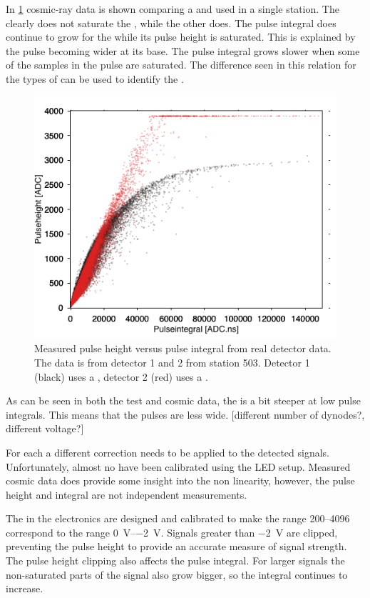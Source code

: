 In \cref{fig:ph_pi_503} cosmic-ray data is shown comparing a \nikhef and \senstech \pmt used in a single station. The \senstech \pmt clearly does not saturate the \adcs, while the other does. The pulse integral does continue to grow for the \nikhef \pmt while its pulse height is saturated. This is explained by the pulse becoming wider at its base. The pulse integral grows slower when some of the samples in the pulse are saturated. The difference seen in this relation for the types of \pmts can be used to identify the \pmt.

\begin{figure}
    \centering
    \includegraphics[width=.7\textwidth]{plots/station/ph_pi_503.png}
    \caption{Measured pulse height versus pulse integral from real detector data. The data is from detector 1 and 2 from station 503. Detector 1 (black) uses a \senstech \pmt, detector 2 (red) uses a \nikhef \pmt.}
    \label{fig:ph_pi_503}
\end{figure}

As can be seen in both the test and cosmic data, the \senstech \pmt is a bit steeper at low pulse integrals. This means that the pulses are less wide. [different number of dynodes?, different voltage?]

For each \senstech \pmt a different correction needs to be applied to the detected signals. Unfortunately, almost no \pmts have been calibrated using the LED setup. Measured cosmic data does provide some insight into the non linearity, however, the pulse height and integral are not independent measurements.

The \adcs in the \hisparc electronics are designed and calibrated to make the range \SIrange{200}{4096}{\adc} correspond to the range \SIrange{0}{-2}{\volt}. Signals greater than \SI{-2}{\volt} are clipped, preventing the pulse height to provide an accurate measure of signal strength. The pulse height clipping also affects the pulse integral. For larger signals the non-saturated parts of the signal also grow bigger, so the integral continues to increase.

